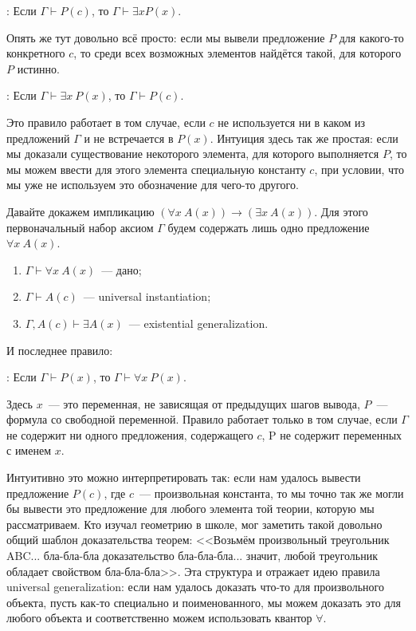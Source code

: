 : Если $\Gamma \vdash P(c)$, то $\Gamma\vdash \exists x P(x)$.

Опять же тут довольно всё просто: если мы вывели предложение $P$ для какого-то конкретного $c$, то среди всех возможных элементов найдётся такой, для которого $P$ истинно.

: Если $\Gamma \vdash \exists x\ P(x)$, то $\Gamma \vdash P(c)$.

Это правило работает в том случае, если $c$ не используется ни в каком из предложений $\Gamma$ и не встречается в $P(x)$. Интуиция здесь так же простая: если мы доказали существование некоторого элемента, для которого выполняется $P$, то мы можем ввести для этого элемента специальную константу $c$, при условии, что мы уже не используем это обозначение для чего-то другого.


\begin{example}
Давайте докажем импликацию $(\forall x\ A(x)) \to (\exists x\ A(x))$. Для этого первоначальный набор аксиом $\Gamma$ будем содержать лишь одно предложение $\forall x\ A(x)$.
\begin{enumerate}
\item $\Gamma\vdash \forall x\ A(x)$~--- дано;
\item $\Gamma \vdash A(c)$~--- universal instantiation;
\item $\Gamma, A(c) \vdash \exists A(x)$~--- existential generalization.
\end{enumerate}
\end{example}

И последнее правило:

: Если $\Gamma \vdash P(x)$, то $\Gamma\vdash \forall x\ P(x)$.

Здесь $x$~--- это переменная, не зависящая от предыдущих шагов вывода, $P$~--- формула со свободной переменной. Правило работает только в том случае, если $\Gamma$ не содержит ни одного предложения, содержащего $c$, P не содержит переменных с именем $x$.

Интуитивно это можно интерпретировать так: если нам удалось вывести предложение $P(c)$, где $c$~--- произвольная константа, то мы точно так же могли бы вывести это предложение для любого элемента той теории, которую мы рассматриваем. Кто изучал геометрию в школе, мог заметить такой довольно общий шаблон доказательства теорем: <<Возьмём произвольный треугольник ABC... бла-бла-бла доказательство бла-бла-бла... значит, любой треугольник обладает свойством бла-бла-бла>>. Эта структура и отражает идею правила universal generalization: если нам удалось доказать что-то для произвольного объекта, пусть как-то специально и поименованного, мы можем доказать это для любого объекта и соответственно можем использовать квантор $\forall$.

